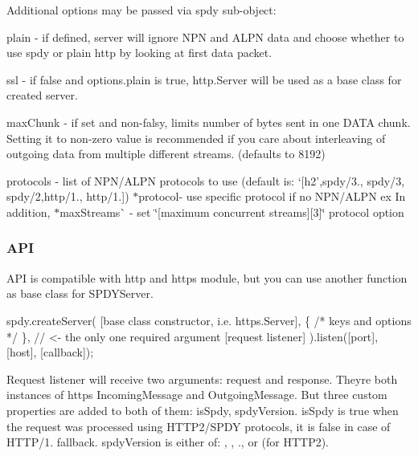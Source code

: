 Additional options may be passed via {\ttfamily spdy} sub-\/object\+:


\begin{DoxyItemize}
\item {\ttfamily plain} -\/ if defined, server will ignore N\+PN and A\+L\+PN data and choose whether to use spdy or plain http by looking at first data packet.
\item {\ttfamily ssl} -\/ if {\ttfamily false} and {\ttfamily options.\+plain} is {\ttfamily true}, {\ttfamily http.\+Server} will be used as a {\ttfamily base} class for created server.
\item {\ttfamily max\+Chunk} -\/ if set and non-\/falsy, limits number of bytes sent in one D\+A\+TA chunk. Setting it to non-\/zero value is recommended if you care about interleaving of outgoing data from multiple different streams. (defaults to 8192)
\item {\ttfamily protocols} -\/ list of N\+P\+N/\+A\+L\+PN protocols to use (default is\+: `\mbox{[}\textquotesingle{}h2',\textquotesingle{}spdy/3.\textquotesingle{}, \textquotesingle{}spdy/3\textquotesingle{}, \textquotesingle{}spdy/2\textquotesingle{},\textquotesingle{}http/1.\textquotesingle{}, \textquotesingle{}http/1.\textquotesingle{}\mbox{]}{\ttfamily ) $\ast$}protocol{\ttfamily -\/ use specific protocol if no N\+P\+N/\+A\+L\+PN ex In addition, $\ast$}max\+Streams\`{} -\/ set \char`\"{}\mbox{[}maximum concurrent streams\mbox{]}\mbox{[}3\mbox{]}\char`\"{} protocol option
\end{DoxyItemize}

\subsubsection*{A\+PI}

A\+PI is compatible with {\ttfamily http} and {\ttfamily https} module, but you can use another function as base class for S\+P\+D\+Y\+Server.


\begin{DoxyCode}
spdy.createServer(
  [base class constructor, i.e. https.Server],
  \{ /* keys and options */ \}, // <- the only one required argument
  [request listener]
).listen([port], [host], [callback]);
\end{DoxyCode}


Request listener will receive two arguments\+: {\ttfamily request} and {\ttfamily response}. They\textquotesingle{}re both instances of {\ttfamily http}\textquotesingle{}s {\ttfamily Incoming\+Message} and {\ttfamily Outgoing\+Message}. But three custom properties are added to both of them\+: {\ttfamily is\+Spdy}, {\ttfamily spdy\+Version}. {\ttfamily is\+Spdy} is {\ttfamily true} when the request was processed using H\+T\+T\+P2/\+S\+P\+DY protocols, it is {\ttfamily false} in case of H\+T\+T\+P/1. fallback. {\ttfamily spdy\+Version} is either of\+: {}, {}, {.}, or {} (for H\+T\+T\+P2).

